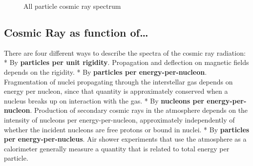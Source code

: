 \documentclass[
  letterpaper,
  DIV=11,
  numbers=noendperiod]{scrreprt}
\begin{document}
\begin{figure}[H]


\caption{\label{fig-cr}All particle cosmic ray spectrum}

\end{figure}%

\subsection*{Cosmic Ray as function
of\ldots{}}\label{cosmic-ray-as-function-of}

There are four different ways to describe the spectra of the cosmic ray
radiation: * By \textbf{particles per unit rigidity}. Propagation and
deflection on magnetic fields depends on the rigidity. * By
\textbf{particles per energy-per-nucleon}. Fragmentation of nuclei
propagating through the interstellar gas depends on energy per nucleon,
since that quantity is approximately conserved when a nucleus breaks up
on interaction with the gas. * By \textbf{nucleons per
energy-per-nucleon}. Production of secondary cosmic rays in the
atmosphere depends on the intensity of nucleons per energy-per-nucleon,
approximately independently of whether the incident nucleons are free
protons or bound in nuclei. * By \textbf{particles per
energy-per-nucleus}. Air shower experiments that use the atmosphere as a
calorimeter generally measure a quantity that is related to total energy
per particle.
\end{document}
